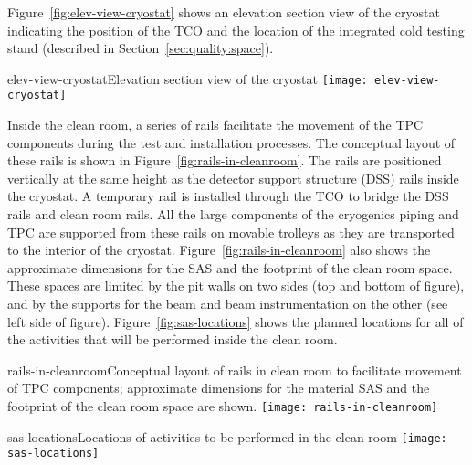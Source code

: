 Figure~\ref{fig:elev-view-cryostat} shows an elevation section view of the cryostat indicating the position of the TCO and the location of the integrated cold testing stand (described in Section~\ref{sec:quality:space}).  

\begin{cdrfigure}{elev-view-cryostat}{Elevation section view of the cryostat}
\texttt{[image: elev-view-cryostat]}
\end{cdrfigure}

Inside the clean room, a series of rails facilitate the movement of the TPC components during the test and installation processes.  The conceptual layout of these rails is shown in Figure~\ref{fig:rails-in-cleanroom}.  The rails are positioned vertically at the same height as the detector support structure (DSS) rails inside the cryostat.  A temporary rail is installed through the TCO to bridge the DSS rails and clean room rails.  All the large components of the cryogenics piping and TPC are supported from these rails on movable trolleys as they are transported to the interior of the cryostat.  
Figure~\ref{fig:rails-in-cleanroom} also shows the approximate dimensions for the SAS and the footprint of the clean room space.  These spaces are limited by the pit walls on two sides (top and bottom of figure), and by the supports for the beam and beam instrumentation on the other (see left side of figure).  Figure~\ref{fig:sas-locations} shows the planned locations for all of the activities that will be performed inside the clean room.  


\begin{cdrfigure}{rails-in-cleanroom}{Conceptual layout of rails in clean room to facilitate movement of TPC components; approximate dimensions for the material SAS and the footprint of the clean room space are shown.}
\texttt{[image: rails-in-cleanroom]}
\end{cdrfigure}


\begin{cdrfigure}{sas-locations}{Locations of activities to be performed in the clean room}
\texttt{[image: sas-locations]}
\end{cdrfigure}

